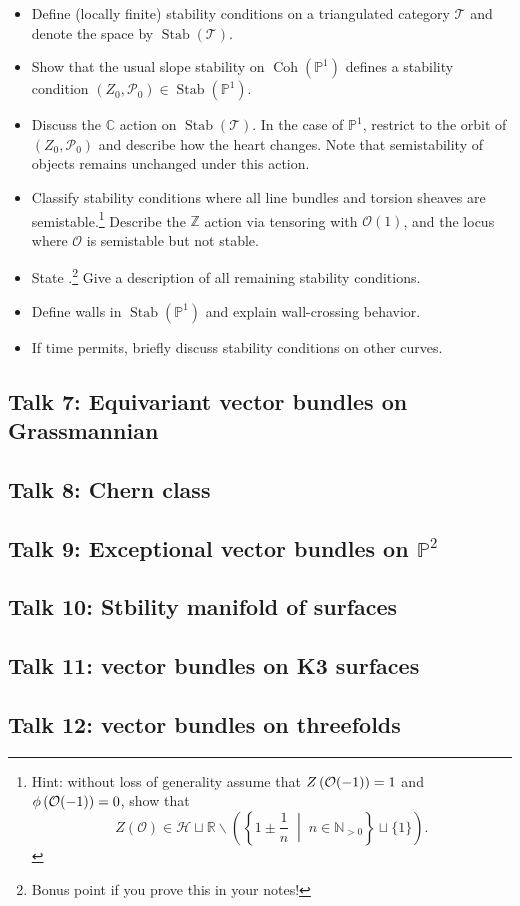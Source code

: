 \documentclass[UTF8]{amsart}
\numberwithin{equation}{section}
\theoremstyle{plain}
\numberwithin{equation}{section}
\theoremstyle{remark}
\DeclareMathOperator{\Coh}{\operatorname{Coh}}
\DeclareMathOperator{\Stab}{\operatorname{Stab}}
\begin{document}
\begin{itemize}
\item Define (locally finite) stability conditions on a triangulated category $\mathcal{T}$ and denote the space by $\Stab(\mathcal{T})$.
\item Show that the usual slope stability on $\Coh(\mathbb{P}^1)$ defines a stability condition $(Z_0, \mathcal{P}_0) \in \Stab(\mathbb{P}^1)$.
\item Discuss the $\mathbb{C}$ action on $\Stab(\mathcal{T})$. In the case of $\mathbb{P}^1$, restrict to the orbit of $(Z_0, \mathcal{P}_0)$ and describe how the heart changes. Note that semistability of objects remains unchanged under this action.
\item Classify stability conditions where all line bundles and torsion sheaves are semistable.\footnote{Hint: without loss of generality assume that $Z\left(\rule{0mm}{2.3mm}\mathcal{O}(-1)\right)=1$ and $\phi\left(\rule{0mm}{2.3mm}\mathcal{O}(-1)\right)=0$, show that
$$Z(\mathcal{O}) \in \mathcal{H} \sqcup \mathbb{R} \smallsetminus \left( \left\{ 1 \pm \frac{1}{n} \;\middle|\; n \in \mathbb{N}_{>0} \right\} \sqcup \{1\} \right).$$
} Describe the $\mathbb{Z}$ action via tensoring with $\mathcal{O}(1)$, and the locus where $\mathcal{O}$ is semistable but not stable.
\item State \cite[Lemma 3.1(d)]{Okada05}.\footnote{Bonus point if you prove this in your notes!} Give a description of all remaining stability conditions.
\item Define walls in $\Stab(\mathbb{P}^1)$ and explain wall-crossing behavior.
\item If time permits, briefly discuss stability conditions on other curves.
\end{itemize}

\subsection*{Talk 7: Equivariant vector bundles on Grassmannian}

\subsection*{Talk 8: Chern class}

\subsection*{Talk 9: Exceptional vector bundles on $\mathbb{P}^2$}

\subsection*{Talk 10: Stbility manifold of surfaces}

\subsection*{Talk 11: vector bundles on K3 surfaces}

\subsection*{Talk 12: vector bundles on threefolds}



\end{document}
